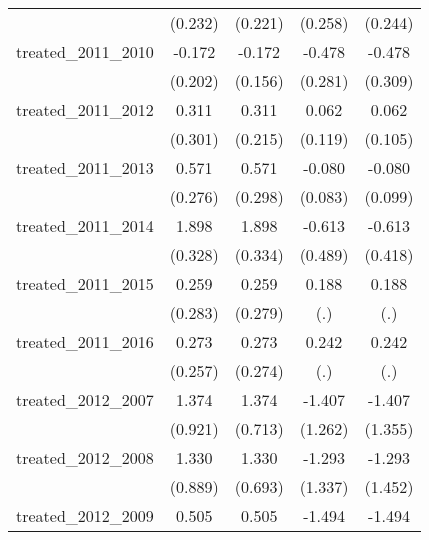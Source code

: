 {\begin{tabular}{l*{4}{c}}
            &     (0.232)         &     (0.221)         &     (0.258)         &     (0.244)         \\
[1em]
treated\_2011\_2010&      -0.172         &      -0.172         &      -0.478         &      -0.478         \\
            &     (0.202)         &     (0.156)         &     (0.281)         &     (0.309)         \\
[1em]
treated\_2011\_2012&       0.311         &       0.311         &       0.062         &       0.062         \\
            &     (0.301)         &     (0.215)         &     (0.119)         &     (0.105)         \\
[1em]
treated\_2011\_2013&       0.571\sym{*}  &       0.571         &      -0.080         &      -0.080         \\
            &     (0.276)         &     (0.298)         &     (0.083)         &     (0.099)         \\
[1em]
treated\_2011\_2014&       1.898\sym{***}&       1.898\sym{***}&      -0.613         &      -0.613         \\
            &     (0.328)         &     (0.334)         &     (0.489)         &     (0.418)         \\
[1em]
treated\_2011\_2015&       0.259         &       0.259         &       0.188         &       0.188         \\
            &     (0.283)         &     (0.279)         &         (.)         &         (.)         \\
[1em]
treated\_2011\_2016&       0.273         &       0.273         &       0.242         &       0.242         \\
            &     (0.257)         &     (0.274)         &         (.)         &         (.)         \\
[1em]
treated\_2012\_2007&       1.374         &       1.374         &      -1.407         &      -1.407         \\
            &     (0.921)         &     (0.713)         &     (1.262)         &     (1.355)         \\
[1em]
treated\_2012\_2008&       1.330         &       1.330         &      -1.293         &      -1.293         \\
            &     (0.889)         &     (0.693)         &     (1.337)         &     (1.452)         \\
[1em]
treated\_2012\_2009&       0.505         &       0.505         &      -1.494         &      -1.494         \\

\end{tabular}}
